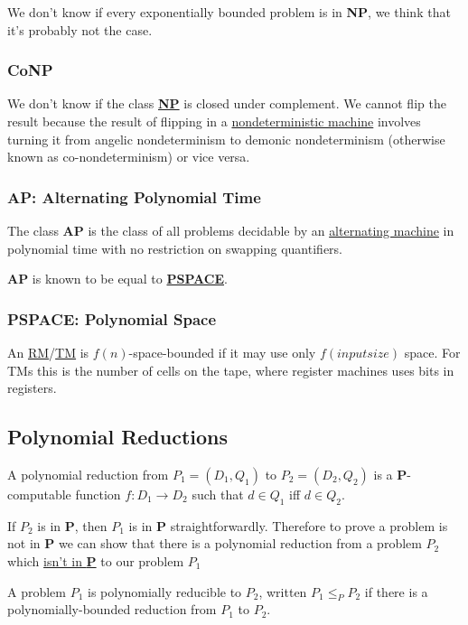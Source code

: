 \documentclass{article}
\begin{document}
We don't know if every exponentially bounded problem is in \textbf{NP}, we think that it's probably not the case.

\subsubsection{CoNP}\label{CoNP}
We don't know if the class \hyperref[NP]{\textbf{NP}} is closed under complement. We cannot flip the result because the result of flipping in a \hyperref[nrm]{nondeterministic machine} involves turning it from angelic nondeterminism to demonic nondeterminism (otherwise known as co-nondeterminism) or vice versa.

\subsubsection{AP: Alternating Polynomial Time}\label{AP}
The class \textbf{AP} is the class of all problems decidable by an \hyperref[alternating-machine]{alternating machine} in polynomial time with no restriction on swapping quantifiers.

\textbf{AP} is known to be equal to \hyperref[PSPACE]{\textbf{PSPACE}}.

\subsubsection{PSPACE: Polynomial Space}\label{PSPACE}
An \hyperref[rm]{RM}/\hyperref[tm]{TM} is $f(n)$-space-bounded if it may use only $f(inputsize)$ space. For TMs this is the number of cells on the tape, where register machines uses bits in registers.


\subsection{Polynomial Reductions}\label{polynomial-reduction}
A polynomial reduction from $P_1 = (D_1, Q_1)$ to $P_2 = (D_2, Q_2)$ is a \textbf{P}-computable function $f : D_1 \to D_2$ such that $d \in Q_1$ iff $d \in Q_2$.

If $P_2$ is in \textbf{P}, then $P_1$ is in \textbf{P} straightforwardly. Therefore to prove a problem is not in \textbf{P} we can show that there is a polynomial reduction from a problem $P_2$ which \hyperref[NP]{isn't in \textbf{P}} to our problem $P_1$

A problem $P_1$ is polynomially reducible to $P_2$, written $P_1 \leq_P P_2$ if there is a polynomially-bounded reduction from $P_1$ to $P_2$.
\end{document}
